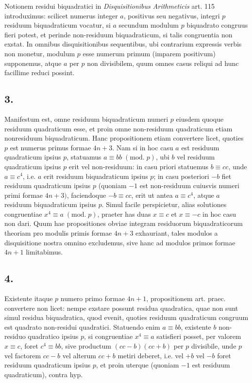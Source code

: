 \documentclass[twoside,12pt, showframe]{memoir}
\renewcommand{\pmod}[1]{\;(\textrm{mod.}\;#1)}
\begin{document}
Notionem residui biquadratici in \textit{Disquisitionibus Arithmeticis} art. 115 introduximus: scilicet numerus integer \(a\), positivus seu negativus, integri \(p\) residuum biquadraticum vocatur, si \(a\) secundum modulum \(p\) biquadrato congruus fieri potest, et perinde non-residuum biquadraticum, si talis congruentia non exstat. In omnibus disquisitionibus sequentibus, ubi contrarium expressis verbis non monetur, modulum \(p\) esse numerum primum (imparem positivum) supponemus, atque \(a\) per \(p\) non divisibilem, quum omnes casus reliqui ad hunc facillime reduci possint.

\subsection*{3.}
 
Manifestum est, omne residuum biquadraticum numeri \(p\) eiusdem quoque residuum quadraticum esse, et proin omne non-residuum quadraticum etiam nonresiduum biquadraticum. Hanc propositionem etiam convertere licet, quoties \(p\) est numerus primus formae \(4 n+3\). Nam si in hoc casu \(a\) est residuum quadraticum ipsius \(p\), statuamus \(a \equiv b b \pmod{p}\), ubi \(b\) vel residuum quadraticum ipsius \(p\) erit vel non-residuum: in casu priori statuemus \(b \equiv c c\), unde \(a \equiv c^{4}\), i.e. \(a\) erit residuum biquadraticum ipsius \(p\); in casu posteriori \(-b\) fiet residuum quadraticum ipsius \(p\) (quoniam \(-1\) est non-residuum cuiusvis numeri primi formae \(4 n+3)\), faciendoque \(-b \equiv c c\), erit ut antea \(a \equiv c^{4}\), atque \(a\) residuum biquadraticum ipsius \(p\). Simul facile perspicietur, alias solutiones congruentiae \(x^{4} \equiv a\pmod{p}\), praeter has duas \(x \equiv c\) et \(x \equiv-c\) in hoc casu non dari. Quum hae propositiones obviae integram residuorum biquadraticorum theoriam pro modulis primis formae \(4 n+3\) exhauriant, tales modulos a disquisitione nostra omnino excludemus, sive hanc ad modulos primos formae \(4 n+1\) limitabimus.

\subsection*{4.}
 
Existente itaque \(p\) numero primo formae \(4 n+1\), propositionem art. praec. convertere non licet: nempe exstare possunt residua quadratica, quae non sunt simul residua biquadratica, quod evenit, quoties residuum quadraticum congruum est quadrato non-residui quadratici. Statuendo enim \(a \equiv b b\), existente \(b\) non-\clearpage\noindent%
residuo quadratico ipsius \(p\), si congruentiae \(x^{4} \equiv a\) satisfieri posset, per valorem \(x \equiv c\), foret \(c^{4} \equiv b b\), sive productum \((c c-b)(c c+b)\) per \(p\) divisibile, unde \(p\) vel factorem \(c c-b\) vel alterum \(c c+b\) metiri deberet, i.e. vel \(+b\) vel \(-b\) foret residuum quadraticum ipsius \(p\), et proin uterque (quoniam \(-1\) est residuum quadraticum), contra hyp.
 
\end{document}

